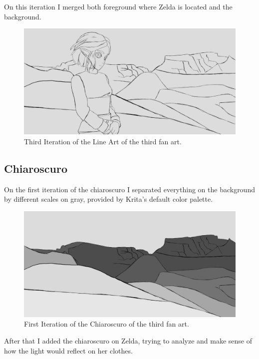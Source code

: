 \documentclass{cup-pan}
\begin{document}
        On this iteration I merged both foreground where Zelda is located and the background.
        \begin{figure}[H]
            \includegraphics[width=\textwidth]{Fanart3/1_LineArt/III_Iteracion.png}
            \caption{Third Iteration of the Line Art of the third fan art.}
        \end{figure}

    \subsection{Chiaroscuro}

        On the first iteration of the chiaroscuro I separated everything on the background by different scales on gray, provided by Krita's default color palette. 
        \begin{figure}[H]
            \includegraphics[width=\textwidth]{Fanart3/2_Claroscuro/I_Iteracion.png}
            \caption{First Iteration of the Chiaroscuro of the third fan art.}
        \end{figure}

        After that I added the chiaroscuro on Zelda, trying to analyze and make sense of how the light would reflect on her clothes.\\
\end{document}
